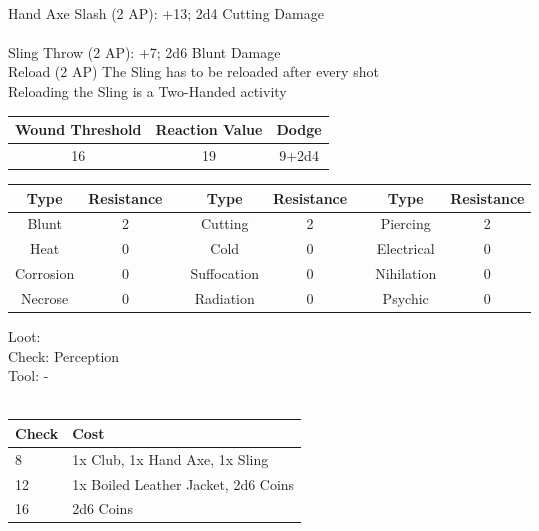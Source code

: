 \\
Hand Axe Slash (2 AP): +13; 2d4 Cutting Damage\\
\\
Sling Throw (2 AP): +7; 2d6 Blunt Damage\\
Reload (2 AP) The Sling has to be reloaded after every shot\\
Reloading the Sling is a Two-Handed activity\\
\bigbreak
\begin{minipage}[H]{1\textwidth}
	\centering
	\begin{tabular}[c]{|c | c | c|}
		\hline
		Wound Threshold & Reaction Value & Dodge\\
		\hline
		16 & 19 & 9+2d4\\
		\hline
	\end{tabular}
\end{minipage}
\bigbreak
\noindent
\begin{minipage}[H]{1\textwidth}
	\centering
	\begin{tabular}[c]{|c | c | c | c | c | c | c | c|}  
		\hline
		Type & Resistance && Type & Resistance && Type & Resistance\\
		\hline
		Blunt & 2 && 
		Cutting & 2 && 
		Piercing & 2\\
		Heat & 0 && 
		Cold & 0 && 
		Electrical & 0\\
		Corrosion & 0 && 
		Suffocation & 0 && 
		Nihilation & 0 \\
		Necrose & 0 && 
		Radiation & 0 && 
		Psychic & 0\\
		\hline
	\end{tabular}
\end{minipage}
\bigbreak
\noindent
Loot:\\
Check: Perception\\
Tool: -\\
\\
\begin{minipage}{0.8\textwidth}
	\begin{tabular}{|l | l|}
		\hline
		Check & Cost\\
		\hline
		8 & 1x Club, 1x Hand Axe, 1x Sling\\
		12 & 1x Boiled Leather Jacket, 2d6 Coins\\
		16 & 2d6 Coins\\
		\hline
	\end{tabular}
\end{minipage}
\pagebreak